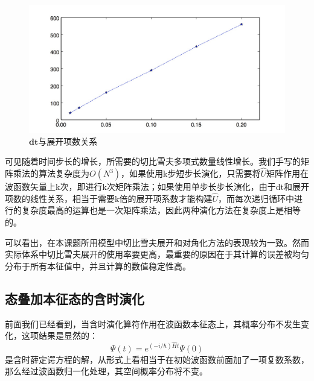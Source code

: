 \begin{figure}[hbt]
  \centering
  \captionsetup{justification=centering}
  \vspace{-1mm}
  \includegraphics[width=0.99\linewidth]{dt-M/dt-M}
  \caption{$\boldsymbol{dt}$与展开项数关系}
  \label{fig:dt-M}
\end{figure}

可见随着时间步长的增长，所需要的切比雪夫多项式数量线性增长。我们手写的矩阵乘法的算法复杂度为$O(N^3)$，如果使用k步短步长演化，只需要将$\hat{U}$矩阵作用在波函数矢量上k次，即进行k次矩阵乘法；如果使用单步长步长演化，由于dt和展开项数的线性关系，相当于需要k倍的展开项系数才能构建$\hat{U}$，而每次递归循环中进行的复杂度最高的运算也是一次矩阵乘法，因此两种演化方法在复杂度上是相等的。

可以看出，在本课题所用模型中切比雪夫展开和对角化方法的表现较为一致。然而实际体系中切比雪夫展开的使用率要更高，最重要的原因在于其计算的误差被均匀分布于所有本征值中，并且计算的数值稳定性高。

\subsection{态叠加本征态的含时演化}
前面我们已经看到，当含时演化算符作用在波函数本征态上，其概率分布不发生变化，这项结果是显然的：
\begin{equation}
  \Psi(t) = e^{(-i/\hbar)\hat{H}t}\Psi(0)
\end{equation} 
是含时薛定谔方程的解，从形式上看相当于在初始波函数前面加了一项复数系数，那么经过波函数归一化处理，其空间概率分布将不变。


